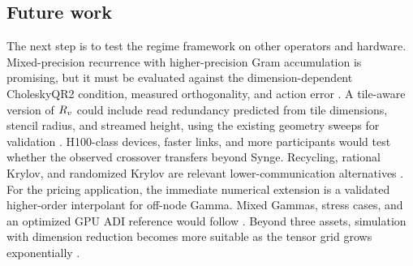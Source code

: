 \subsection{Future work}\label{sec:future}

The next step is to test the regime framework on other operators and hardware.
Mixed-precision recurrence with higher-precision Gram accumulation is
promising, but it must be evaluated against the dimension-dependent
CholeskyQR2 condition, measured orthogonality, and action error
\cite{higham-mary-2022,abdelfattah-2021}. A tile-aware version of $R_v$ could
include read redundancy predicted from tile dimensions, stencil radius, and
streamed height, using the existing geometry sweeps for validation
\cite{alappat-2022}. H100-class devices, faster links, and more participants
would test whether the observed crossover transfers beyond Synge. Recycling,
rational Krylov, and randomized Krylov are relevant lower-communication
alternatives \cite{parks-2006,de-damas-grigori-2025}. For the pricing
application, the immediate numerical extension is a validated higher-order
interpolant for off-node Gamma. Mixed Gammas, stress cases, and an optimized GPU
ADI reference would follow \cite{raahauge-2004,dang-christara-jackson-2010}.
Beyond three assets, simulation with dimension reduction becomes more suitable
as the tensor grid grows exponentially \cite{wang-2009,weng-wang-he-2017}.
